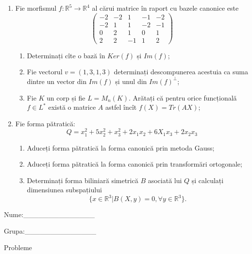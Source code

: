\documentclass{article}
\begin{document}
\begin{enumerate}
 \item Fie morfismul $f:\mathbb{R}^5 \to \mathbb{R}^4$ al cărui matrice în raport cu bazele canonice este
$$\begin{pmatrix}
-2&-2&1&-1&-2\\
-2&1&1&-2&-1\\
0&2&1&0&1\\
2&2&-1&1&2
\end{pmatrix}$$

\begin{enumerate}
\item Determinați cîte o bază în $Ker(f)$ și $Im(f)$;
\item Fie vectorul $v=(1,3,1,3)$ determinați descompunerea acestuia ca suma dintre un vector din $Im(f)$ și unul din $Im(f)^\perp$;
\item Fie $K$ un corp și fie $L=M_n(K)$. Arătați că pentru orice funcțională $f \in L^*$ există o matrice $A$ astfel încît $f(X)=Tr(AX)$;
\end{enumerate}
\item Fie forma pătratică:
$$Q= x_1^2+5x_2^2+x_3^2+2x_1x_2+6X_1x_3+2x_2x_3$$

\begin{enumerate}
\item Aduceți forma pătratică la forma canonică prin metoda Gauss;
\item Aduceți forma pătratică la forma canonică prin transformări ortogonale;
\item Determinați forma biliniară simetrică $B$ asociată lui $Q$ și calculați dimensiunea subspațiului
$$\{x \in \mathbb{R}^3 | B(X,y)=0,\forall y \in \mathbb{R}^3\}.$$

\end{enumerate}
\end{enumerate}
\newpage
\begin{flushright}
Nume:\_\_\_\_\_\_\_\_\_\_\_\_\_\_
 
 
Grupa:\_\_\_\_\_\_\_\_\_\_\_\_\_\_
\end{flushright}
\begin{center}
\vspace{2cm}
{\Large Probleme}
\vspace{2cm}
\end{center}
\end{document}
